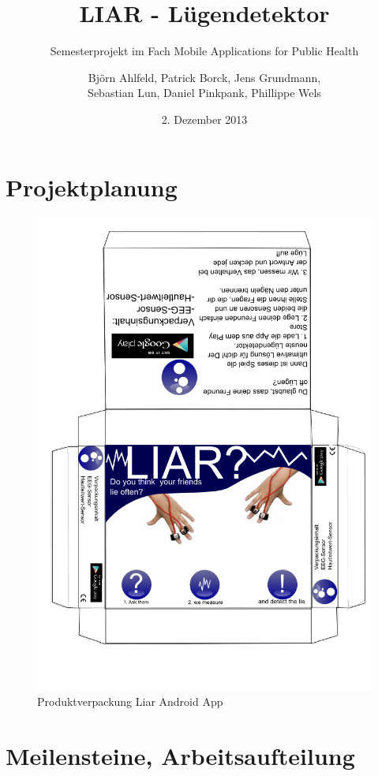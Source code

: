 \documentclass[10pt, a4paper, oneside, titlepage]{scrartcl} %
\date{2. Dezember 2013}
\author{Björn Ahlfeld, Patrick Borck, Jens Grundmann,\\ Sebastian Lun, Daniel Pinkpank, Phillippe Wels}
\title{LIAR - Lügendetektor}
\subtitle{Semesterprojekt im Fach Mobile Applications for Public Health}
\begin{document}
   	\maketitle
   	\thispagestyle{empty}
	\tableofcontents
	\listoffigures
	\listoftables
   	\newpage
   	\section{Projektplanung}  
   \begin{figure}[ht!]
	\begin{center}
		\includegraphics[scale=0.5]{verpackung_bjoern.png}
	\end{center}
	\caption[Produktverpackung]{Produktverpackung Liar Android App}
	\label{fig:verpackung}
	\end{figure}

   	\section{Meilensteine, Arbeitsaufteilung}
   
\end{document}
